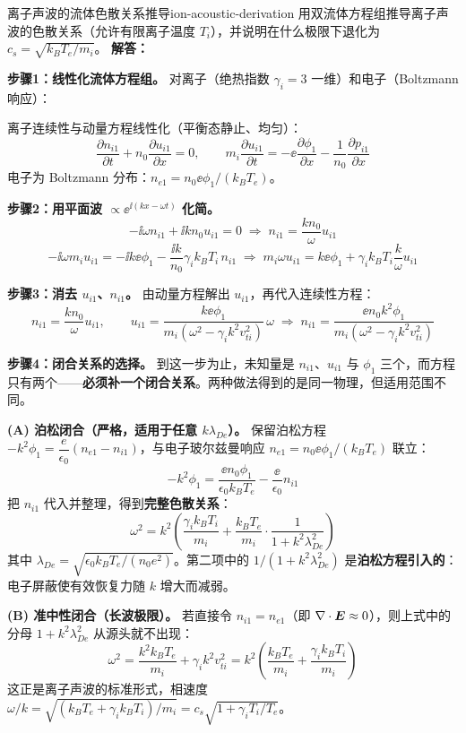 \begin{example}{离子声波的流体色散关系推导}{ion-acoustic-derivation}
用双流体方程组推导离子声波的色散关系（允许有限离子温度 $T_i$），并说明在什么极限下退化为 $c_s = \sqrt{k_{\!B}T_e/m_i}$。
\tcblower
\textbf{解答：}

\textbf{步骤1：线性化流体方程组。} 对离子（绝热指数 $\gamma_i = 3$ 一维）和电子（Boltzmann 响应）：

离子连续性与动量方程线性化（平衡态静止、均匀）：
\[
\frac{\partial n_{i1}}{\partial t} + n_0\frac{\partial u_{i1}}{\partial x} = 0, \qquad
m_i\frac{\partial u_{i1}}{\partial t} = -\ee\frac{\partial\phi_1}{\partial x} - \frac{1}{n_0}\frac{\partial p_{i1}}{\partial x}
\]
电子为 Boltzmann 分布：$n_{e1} = n_0\ee\phi_1/(k_{\!B}T_e)$。

\textbf{步骤2：用平面波 $\propto\ee^{\ii(kx-\omega t)}$ 化简。}
\[
-\ii\omega n_{i1} + \ii k n_0 u_{i1} = 0 \;\Rightarrow\; n_{i1} = \frac{k n_0}{\omega}u_{i1}
\]
\[
-\ii\omega m_i u_{i1} = -\ii k \ee\phi_1 - \frac{\ii k}{n_0}\gamma_i k_{\!B}T_i\, n_{i1}
\;\Rightarrow\; m_i\omega u_{i1} = k\ee\phi_1 + \gamma_i k_{\!B}T_i\frac{k}{\omega}u_{i1}
\]

\textbf{步骤3：消去 $u_{i1}$、$n_{i1}$。} 由动量方程解出 $u_{i1}$，再代入连续性方程：
\[
n_{i1} = \frac{k n_0}{\omega}u_{i1}, \qquad
u_{i1} = \frac{k\ee\phi_1}{m_i(\omega^2 - \gamma_i k^2 v_{ti}^2)}\,\omega
\;\Longrightarrow\;
n_{i1} = \frac{\ee n_0 k^2\phi_1}{m_i(\omega^2 - \gamma_i k^2 v_{ti}^2)}
\]

\textbf{步骤4：闭合关系的选择。} 到这一步为止，未知量是 $n_{i1}$、$u_{i1}$ 与 $\phi_1$ 三个，而方程只有两个——\textbf{必须补一个闭合关系}。两种做法得到的是同一物理，但适用范围不同。

\smallskip
\textbf{(A) 泊松闭合（严格，适用于任意 $k\lambda_{De}$）。} 保留泊松方程 $-k^2\phi_1 = \dfrac{e}{\epsilon_0}(n_{e1}-n_{i1})$，与电子玻尔兹曼响应 $n_{e1}=n_0\ee\phi_1/(k_{\!B}T_e)$ 联立：
\[
-k^2\phi_1 = \frac{\ee n_0\phi_1}{\epsilon_0 k_{\!B}T_e} - \frac{\ee}{\epsilon_0}n_{i1}
\]
把 $n_{i1}$ 代入并整理，得到\textbf{完整色散关系}：
\[
\boxed{\;\omega^2 = k^2\left(\frac{\gamma_i k_{\!B}T_i}{m_i} + \frac{k_{\!B}T_e}{m_i}\cdot\frac{1}{1+k^2\lambda_{De}^2}\right)\;}
\]
其中 $\lambda_{De}=\sqrt{\epsilon_0 k_{\!B}T_e/(n_0e^2)}$。第二项中的 $1/(1+k^2\lambda_{De}^2)$ 是\textbf{泊松方程引入的}：电子屏蔽使有效恢复力随 $k$ 增大而减弱。

\smallskip
\textbf{(B) 准中性闭合（长波极限）。} 若直接令 $n_{i1}=n_{e1}$（即 $\nabla\cdot\bm{E}\approx0$），则上式中的分母 $1+k^2\lambda_{De}^2$ 从源头就不出现：
\[
\omega^2 = \frac{k^2 k_{\!B}T_e}{m_i} + \gamma_i k^2 v_{ti}^2
= k^2\left(\frac{k_{\!B}T_e}{m_i} + \frac{\gamma_i k_{\!B}T_i}{m_i}\right)
\]
这正是离子声波的标准形式，相速度 $\omega/k=\sqrt{(k_{\!B}T_e+\gamma_i k_{\!B}T_i)/m_i}=c_s\sqrt{1+\gamma_i T_i/T_e}$。


\end{example}
